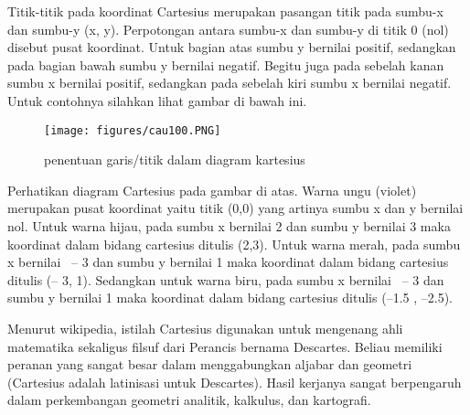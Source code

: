 Titik-titik pada koordinat Cartesius merupakan pasangan titik pada sumbu-x dan sumbu-y (x, y). Perpotongan antara sumbu-x dan sumbu-y di titik 0 (nol) disebut pusat koordinat. Untuk bagian atas sumbu y bernilai positif, sedangkan pada bagian bawah sumbu y bernilai negatif. Begitu juga pada sebelah kanan sumbu x bernilai positif, sedangkan pada sebelah kiri sumbu x bernilai negatif. Untuk contohnya silahkan lihat gambar di bawah ini. 
\begin{figure}[ht]
	\centerline{\texttt{[image: figures/cau100.PNG]}}
	\caption{penentuan garis/titik dalam diagram kartesius}
	\label{cau100}
	\end{figure}

Perhatikan diagram Cartesius pada gambar di atas. Warna ungu (violet) merupakan pusat koordinat yaitu titik (0,0) yang artinya sumbu x dan y bernilai nol. Untuk warna hijau, pada sumbu x bernilai 2 dan sumbu y bernilai 3 maka koordinat dalam bidang cartesius ditulis (2,3). Untuk warna merah, pada sumbu x bernilai  – 3 dan sumbu y bernilai 1 maka koordinat dalam bidang cartesius ditulis (– 3, 1). Sedangkan untuk warna biru, pada sumbu x bernilai  – 3 dan sumbu y bernilai 1 maka koordinat dalam bidang cartesius ditulis (–1.5 , –2.5).

Menurut wikipedia, istilah Cartesius digunakan untuk mengenang ahli matematika sekaligus filsuf dari Perancis bernama Descartes. Beliau memiliki peranan yang sangat besar dalam menggabungkan aljabar dan geometri (Cartesius adalah latinisasi untuk Descartes). Hasil kerjanya sangat berpengaruh dalam perkembangan geometri analitik, kalkulus, dan kartografi.


